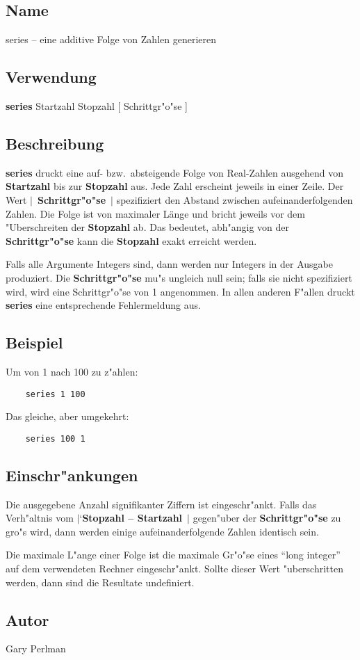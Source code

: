 
\subsection*{Name}
series -- eine additive Folge von Zahlen generieren

\subsection*{Verwendung}

{\bf series} Startzahl Stopzahl [ Schrittgr"o"se ]

\subsection*{Beschreibung}

{\bf series} druckt eine auf- bzw.\ absteigende Folge von
Real-Zahlen ausgehend von {\bf Startzahl} bis zur {\bf Stopzahl}
aus.
Jede Zahl erscheint jeweils in einer Zeile.
Der Wert $\mid$~{\bf Schrittgr"o"se}~$\mid$ spezifiziert den Abstand
zwischen aufeinanderfolgenden Zahlen.
Die Folge ist von maximaler L\"ange und bricht jeweils vor dem
"Uberschreiten der {\bf Stopzahl} ab.
Das bedeutet, abh"angig von der {\bf Schrittgr"o"se} kann die
{\bf Stopzahl} exakt erreicht werden.

Falls alle Argumente Integers sind, dann werden nur Integers in 
der Ausgabe produziert. 
Die {\bf Schrittgr"o"se} mu"s ungleich null sein;
falls sie nicht spezifiziert wird, wird eine Schrittgr"o"se
von 1 angenommen.
In allen anderen F"allen druckt {\bf series} eine entsprechende
Fehlermeldung aus.

\subsection*{Beispiel}
Um von 1 nach 100 zu z"ahlen:
\begin{verbatim}
	series 1 100 
\end{verbatim}
Das gleiche, aber umgekehrt:
\begin{verbatim}
	series 100 1
\end{verbatim}

\subsection*{Einschr"ankungen}

Die ausgegebene Anzahl signifikanter Ziffern ist eingeschr"ankt.
Falls das Verh"altnis vom $\mid$`{\bf Stopzahl -- Startzahl}~$\mid$
gegen"uber der {\bf Schrittgr"o"se} zu gro"s wird, dann werden
einige aufeinanderfolgende Zahlen identisch sein.

Die maximale L"ange einer Folge ist die maximale Gr"o"se eines 
``long integer'' auf dem verwendeten Rechner eingeschr"ankt.
Sollte dieser Wert "uberschritten werden, dann sind die Resultate
undefiniert. 

\subsection*{Autor}

Gary Perlman
